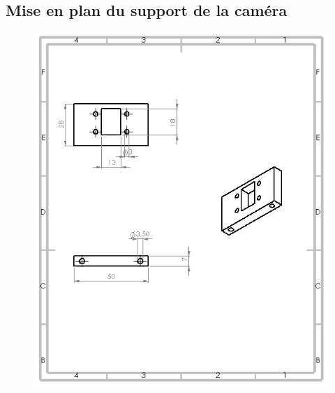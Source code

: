 \begin{changemargin}{-2cm}{-4cm}
\chapter*{Mise en plan du support de la caméra}
\begin{figure}[!h]
 \center
 \includegraphics[scale=0.95]{../3Dmodels/camera.png}
\end{figure}

\end{changemargin}